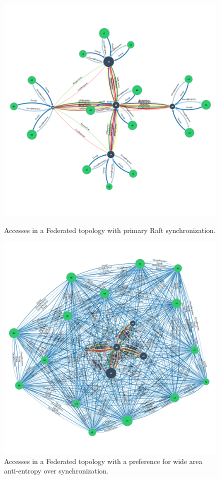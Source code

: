 \documentclass[10pt,conference,letterpaper]{IEEEtran}
\begin{document}
\begin{figure}
    \centering
      \includegraphics[width=\linewidth]{figures/conflict/federated_sync}
      \caption{Accesses in a Federated topology with primary Raft synchronization.}\label{fig:federated_sync}
    \endminipage\hfill
      \includegraphics[width=\linewidth]{figures/conflict/federated_eventual}
      \caption{Accesses in a Federated topology with a preference for wide area anti-entropy over synchronization.}\label{fig:federated_eventual}
    \endminipage\hfill
\end{figure}
\end{document}
